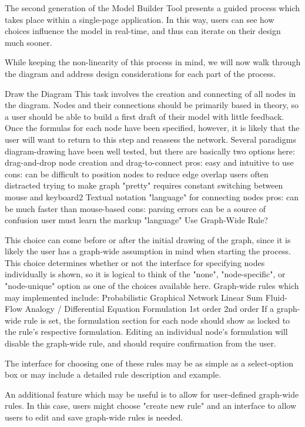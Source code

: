 The second generation of the Model Builder Tool presents a guided process which takes place within a single-page application. 
In this way, users can see how choices influence the model in real-time, and thus can iterate on their design much sooner.

While keeping the non-linearity of this process in mind, we will now walk through the diagram and address design considerations for each part of the process.

Draw the Diagram
This task involves the creation and connecting of all nodes in the diagram. Nodes and their connections should be primarily based in theory, so a user should be able to build a first draft of their model with little feedback. Once the formulas for each node have been specified, however, it is likely that the user will want to return to this step and reassess the network. Several paradigms diagram-drawing have been well tested, but there are basically two options here:
drag-and-drop node creation and drag-to-connect
pros:
easy and intuitive to use
cons: 
can be difficult to position nodes to reduce edge overlap
users often distracted trying to make graph "pretty"
requires constant switching between mouse and keyboard2
Textual notation "language" for connecting nodes
pros:
can be much faster than mouse-based
cons:
parsing errors can be a source of confusion
user must learn the markup "language"
Use Graph-Wide Rule?

This choice can come before or after the initial drawing of the graph, since it is likely the user has a graph-wide assumption in mind when starting the process. This choice determines whether or not the interface for specifying nodes individually is shown, so it is logical to think of the "none", "node-specific", or "node-unique" option as one of the choices available here. Graph-wide rules which may implemented include:
Probabilistic Graphical Network
Linear Sum
Fluid-Flow Analogy / Differential Equation Formulation 
1st order
2nd order
If a graph-wide rule is set, the formulation section for each node should show as locked to the rule's respective formulation. Editing an individual node's formulation will disable the graph-wide rule, and should require confirmation from the user. 

The interface for choosing one of these rules may be as simple as a select-option box or may include a detailed rule description and example. 

An additional feature which may be useful is to allow for user-defined graph-wide rules. In this case, users might choose "create new rule" and an interface to allow users to edit and save graph-wide rules is needed.


